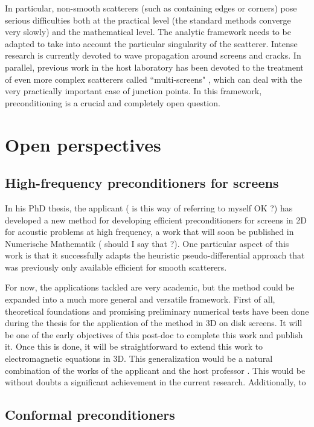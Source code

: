 \documentclass[]{article}
\begin{document}
In particular, non-smooth scatterers (such as containing edges or corners) pose serious difficulties both at the practical level (the standard methods converge very slowly) and the mathematical level. The analytic framework needs to be adapted to take into account the particular singularity of the scatterer. Intense research is currently devoted to wave propagation around screens and cracks. In parallel, previous work in the host laboratory has been devoted to the treatment of even more complex scatterers called ``multi-screens" \cite{claeys2013integral,claeys2020quotient}, which can deal with the very practically important case of junction points. In this framework, preconditioning is a crucial and completely open question.  

 
\section{Open perspectives}

\subsection*{High-frequency preconditioners for screens}

In his PhD thesis, the applicant ({\color{red} is this way of referring to myself OK ?}) has developed a new method for developing efficient preconditioners for screens in 2D for acoustic problems at high frequency, a work that will soon be published in Numerische Mathematik ({\color{red} should I say that ?}). One particular aspect of this work is that it successfully adapts the heuristic pseudo-differential approach that was previously only available efficient for smooth scatterers. 

For now, the applications tackled are very academic, but the method could be expanded into a much more general and versatile framework. First of all, theoretical foundations and promising preliminary numerical tests have been done during the thesis for the application of the method in 3D on disk screens. It will be one of the early objectives of this post-doc to complete this work and publish it. Once this is done, it will be straightforward to extend this work to electromagnetic equations in 3D. This generalization would be a natural combination of the works of the applicant and the host professor \cite{hiptmair2019preconditioning}. This would be without doubts a significant achievement in the current research. Additionally,  
to
\subsection*{Conformal preconditioners}
\end{document}
